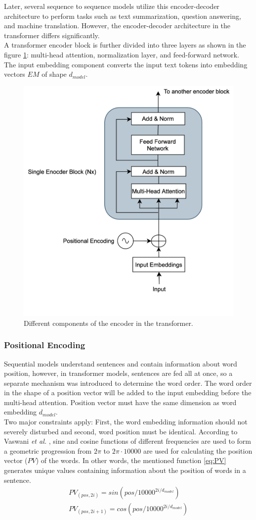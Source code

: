 \documentclass[%
	BCOR=8mm, %
	DIV=12,
	toc=bibliography, %
	toc=listof, %
	oneside, %
	egregdoesnotlikesansseriftitles, %
	]{scrbook}
\begin{document}
 Later, several sequence to sequence models utilize this encoder-decoder architecture to perform tasks such as text summarization, question answering, and machine translation. However, the encoder-decoder architecture in the transformer differs significantly.\\
A transformer encoder block is further divided into three layers as shown in the figure \ref{diag:EncoderArch}: multi-head attention, normalization layer, and feed-forward network. The input embedding component converts the input text tokens into embedding vectors $EM$ of shape $d_{model}$.
\begin{figure}[H]
\centering
\includegraphics[width=.50\textwidth]{img/EncoderArch.png}
\caption[Different components of an encoder in transformer]{Different components of the encoder in the transformer.}
\label{diag:EncoderArch}
\end{figure}
\subsubsection{Positional Encoding}
Sequential models understand sentences and contain information about word position, however, in transformer models, sentences are fed all at once, so a separate mechanism was introduced to determine the word order. The word order in the shape of a position vector will be added to the input embedding before the multi-head attention. Position vector must have the same dimension as word embedding $d_{model}$.\\
Two major constraints apply: First, the word embedding information should not severely disturbed and second, word position must be identical. According to Vaswani \textit{et al.} \cite{vaswani_attention_2017}, sine and cosine functions of different frequencies are used to form a geometric progression from  $2\pi$ to $2\pi \cdot 10000$ are used for calculating the position vector ($PV$) of the words. In other words, the mentioned function \ref{eq:PV} generates unique values containing information about the position of words in a sentence.
\begin{equation}
\begin{aligned}
    PV_{(pos,2i)}=sin(pos/10000^{2i/d_{model}})\\
    PV_{(pos,2i+1)}=cos(pos/10000^{2i/d_{model}})
    \label{eq:PV}
\end{aligned}
\end{equation}
\end{document}
